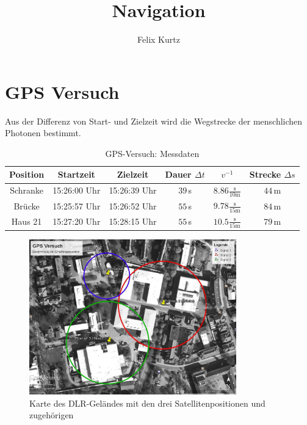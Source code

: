 \documentclass[12pt,a4paper,headinclude,bibtotoc]{scrartcl}
\begin{document}
\title{Navigation}
\author{Felix Kurtz}
\maketitle

\section{GPS Versuch}
Aus der Differenz von Start- und Zielzeit wird die Wegstrecke der menschlichen Photonen bestimmt.
\begin{table}[!htb]
	\centering
	\begin{tabular}{|c|c|c|c|c|c|}
		\hline		
		Position & Startzeit & Zielzeit & Dauer $\Delta t$ & $v^{-1}$ & Strecke $\Delta s$\\
		\hline
		Schranke & 15:26:00 Uhr & 15:26:39 Uhr & $39\,$s & $8.86 \frac{\si{\second}}{10\si{\meter}}$ & $44\,$m\\
		Brücke & 15:25:57 Uhr & 15:26:52 Uhr & $55\,$s & $9.78 \frac{\si{\second}}{15\si{\meter}}$ & $84\,$m\\
		Haus 21 & 15:27:20 Uhr & 15:28:15 Uhr & $55\,$s & $10.5 \frac{\si{\second}}{15\si{\meter}}$ & $79\,$m\\
		\hline
	\end{tabular}
	\caption{GPS-Versuch: Messdaten}
\end{table}

\begin{figure}[!htb]
	\centering
	\includegraphics[width=0.8\textwidth]{GPS.jpg}
	\caption{Karte des DLR-Geländes mit den drei Satellitenpositionen und zugehörigen}
	\label{fig:gps}
\end{figure}
\end{document}

